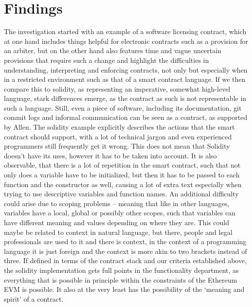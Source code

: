 \documentclass{article}
\begin{document}
\section{Findings}
The investigation started with an example of a software licensing contract, which at one hand includes things helpful for electronic contracts such as a provision for an arbiter, but on the other hand also features time and vague uncertain provisions that require such a change and highlight the difficulties in understanding, interpreting and enforcing contracts, not only but especially when in a restricted environment such as that of a smart contract language.
If we then compare this to solidity, as representing an imperative, somewhat high-level language, stark differences emerge, as the contract as such is not representable in such a language. Still, even a piece of software, including its documentation, git commit logs and informal communication %
can be seen as a contract, as supported %
by Allen. \cite{allenWrappedStackedSmart2018}  The solidity example explicitly describes the actions that the smart contract should support, with a lot of technical jargon and even experienced programmers still frequently get it wrong. This does not mean that Solidity doesn’t have its uses, however it has to be taken into account. It is also observable, that there is a lot of repetition in the smart contract, such that not only does a variable have to be initialized, but then it has to be passed to each function and the constructor as well, causing a lot of extra text especially when trying to use descriptive variables and function names. An additional difficulty could arise due to scoping problems – meaning that like in other languages, variables have a local, global or possibly other scopes, such that variables can have different meaning and values depending on where they are. This could maybe be related to context in natural language, but there, people and legal professionals are used to it and there is context, in the context of %
a programming language it is just foreign and the context is more akin to two brackets instead of three.
If defined in terms of the contract stack and our criteria established above, the solidity implementation gets full points in the functionality department, as everything that is possible in principle within the constraints of the Ethereum EVM is possible. It also at the very least has the possibility of the ‘meaning and spirit’ of a contract.
\end{document}
